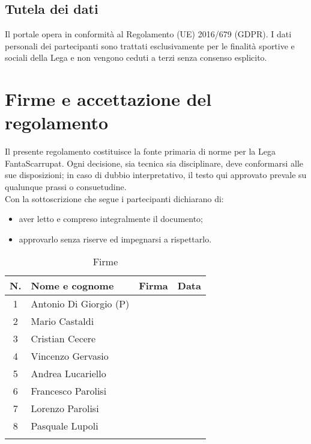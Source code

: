 \section{Tutela dei dati}
\label{art:10.6}

Il portale opera in conformità al Regolamento (UE) 2016/679 (GDPR). I dati personali dei partecipanti sono trattati esclusivamente per le finalità sportive e sociali della Lega e non vengono ceduti a terzi senza consenso esplicito.



\chapter{Firme e accettazione del regolamento}
\label{cap:firme}

Il presente regolamento costituisce la fonte primaria di norme per la Lega FantaScarrupat. Ogni decisione, sia tecnica sia disciplinare, deve conformarsi alle sue disposizioni; in caso di dubbio interpretativo, il testo qui approvato prevale su qualunque prassi o consuetudine. \\

\noindent
Con la sottoscrizione che segue i partecipanti dichiarano di:
\begin{itemize}
  \item aver letto e compreso integralmente il documento;
  \item approvarlo senza riserve ed impegnarsi a rispettarlo.
\end{itemize}

\begin{longtable}{|c|p{4.5cm}|p{4.5cm}|p{2.8cm}|}
  \hline
  \textbf{N.} & \textbf{Nome e cognome} & \textbf{Firma} & \textbf{Data} \\
  \hline
  1 & Antonio Di Giorgio (P) & & \\
  \hline
  2 & Mario Castaldi & & \\
  \hline
  3 & Cristian Cecere & & \\
  \hline
  4 & Vincenzo Gervasio & & \\
  \hline
  5 & Andrea Lucariello & & \\
  \hline
  6 & Francesco Parolisi & & \\
  \hline
  7 & Lorenzo Parolisi & & \\
  \hline
  8 & Pasquale Lupoli & & \\
  \hline
  \caption{Firme}
\end{longtable}
